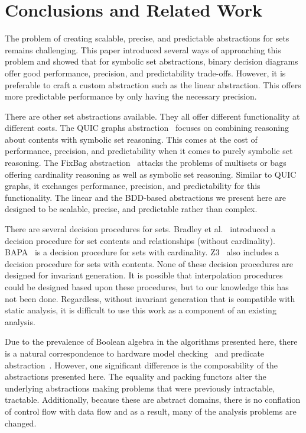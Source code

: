 \section{Conclusions and Related Work}
The problem of creating scalable, precise, and predictable abstractions for sets remains challenging.  This paper introduced several ways of approaching this problem and showed that for symbolic set abstractions, binary decision diagrams offer good performance, precision, and predictability trade-offs.  However, it is preferable to craft a custom abstraction such as the linear abstraction.  This offers more predictable performance by only having the necessary precision.

There are other set abstractions available.
They all offer different functionality at different costs.
The QUIC graphs abstraction~\cite{ab:ecoop:13,quicr:cav:14} focuses on
combining reasoning about contents with symbolic set reasoning.
This comes at the cost of performance, precision, and predictability
when it comes to purely symbolic set reasoning.
The FixBag abstraction~\cite{fixbag:cav:11} attacks the problems of
multisets or bags offering cardinality reasoning as well as symbolic
set reasoning.
Similar to QUIC graphs, it exchanges performance, precision, and
predictability for this functionality.
The linear and the BDD-based abstractions we present here are designed
to be scalable, precise, and predictable rather than complex.

There are several decision procedures for sets.  Bradley et al.~\cite{bradley:vmcai:06} introduced a decision procedure for set contents and relationships (without cardinality).  BAPA~\cite{knr:jar:06,jahob:thesis:07} is a decision procedure for sets with cardinality.  Z3~\cite{mb:tacas:08} also includes a decision procedure for sets with contents.  None of these decision procedures are designed for invariant generation.  It is possible that interpolation procedures~\cite{interp:cav:03} could be designed based upon these procedures, but to our knowledge this has not been done.  Regardless, without invariant generation that is compatible with static analysis, it is difficult to use this work as a component of an existing analysis.

Due to the prevalence of Boolean algebra in the algorithms presented here, there is a natural correspondence to hardware model checking~\cite{mc:toplas:86} and predicate abstraction~\cite{sympred:cav:03}.  However, one significant difference is the composability of the abstractions presented here.  The equality and packing functors alter the underlying abstractions making problems that were previously intractable, tractable.  Additionally, because these are abstract domains, there is no conflation of control flow with data flow and as a result, many of the analysis problems are changed.


